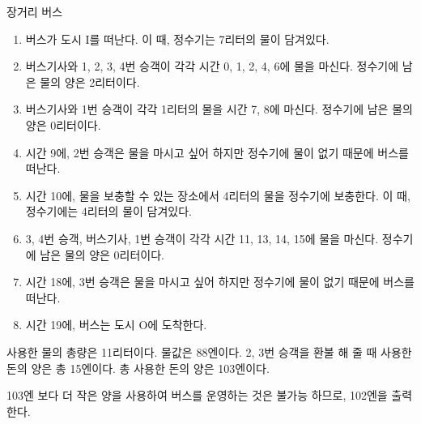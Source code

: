 \begin{problem}{장거리 버스}
	\begin{enumerate}
		
		\item 버스가 도시 I를 떠난다. 이 때, 정수기는 7리터의 물이 담겨있다.
		\item 버스기사와 1, 2, 3, 4번 승객이 각각 시간 0, 1, 2, 4, 6에 물을 마신다. 정수기에 남은 물의 양은 2리터이다.
		\item 버스기사와 1번 승객이 각각 1리터의 물을 시간 7, 8에 마신다. 정수기에 남은 물의 양은 0리터이다.
		\item 시간 9에, 2번 승객은 물을 마시고 싶어 하지만 정수기에 물이 없기 때문에 버스를 떠난다.
		\item 시간 10에, 물을 보충할 수 있는 장소에서 4리터의 물을 정수기에 보충한다. 이 때, 정수기에는 4리터의 물이 담겨있다.
		\item 3, 4번 승객, 버스기사, 1번 승객이 각각 시간 11, 13, 14, 15에 물을 마신다. 정수기에 남은 물의 양은 0리터이다.
		\item 시간 18에, 3번 승객은 물을 마시고 싶어 하지만 정수기에 물이 없기 때문에 버스를 떠난다.
		\item 시간 19에, 버스는 도시 O에 도착한다.
	\end{enumerate}

	사용한 물의 총량은 11리터이다. 물값은 88엔이다. 2, 3번 승객을 환불 해 줄 때 사용한 돈의 양은 총 15엔이다. 총 사용한 돈의 양은 103엔이다.
	
	103엔 보다 더 작은 양을 사용하여 버스를 운영하는 것은 불가능 하므로, 102엔을 출력한다.
	
	
	\begin{example}
	\end{example}

	
\end{problem}


